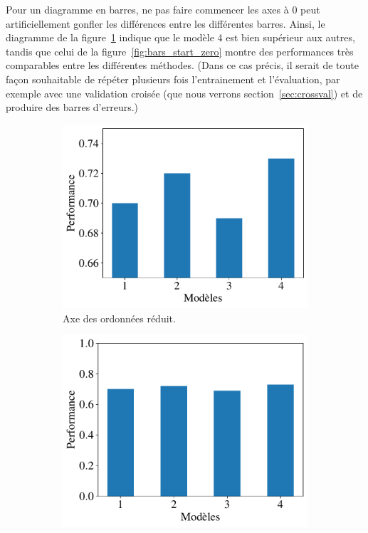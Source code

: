 Pour un diagramme en barres, ne pas faire commencer les axes à 0 peut
artificiellement gonfler les différences entre les différentes barres. Ainsi,
le diagramme de la figure~\ref{fig:bars_start_nonzero} indique que le modèle 4
est bien supérieur aux autres, tandis que celui de la
figure~\ref{fig:bars_start_zero} montre des performances très comparables entre
les différentes méthodes. (Dans ce cas précis, il serait de toute façon
souhaitable de répéter plusieurs fois l'entrainement et l'évaluation, par
exemple avec une validation croisée (que nous verrons
section~\ref{sec:crossval}) et de produire des barres d'erreurs.)
\begin{figure}[h]
  \centering
  \begin{subfigure}[t]{0.47\textwidth}
    \centering
    \includegraphics[width=\textwidth]{figures/pratiques/bars_start_nonzero}
    \caption{Axe des ordonnées réduit.}
    \label{fig:bars_start_nonzero}
  \end{subfigure} \hfill
  \begin{subfigure}[t]{0.47\textwidth}
    \includegraphics[width=\textwidth]{figures/pratiques/bars_start_zero}  

\end{subfigure}
\end{figure}
